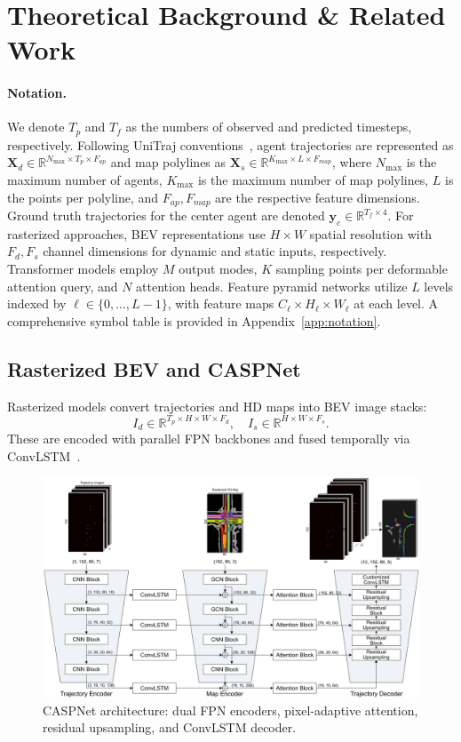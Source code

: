 \section{Theoretical Background \& Related Work}
\label{sec:background}

\paragraph{Notation.} We denote \(T_p\) and \(T_f\) as the numbers of observed and predicted timesteps, respectively. Following UniTraj conventions~\cite{unitrajFeng2024}, agent trajectories are represented as \(\boldsymbol{X}_d \in \mathbb{R}^{N_{\max} \times T_p \times F_{ap}}\) and map polylines as \(\boldsymbol{X}_s \in \mathbb{R}^{K_{\max} \times L \times F_{map}}\), where \(N_{\max}\) is the maximum number of agents, \(K_{\max}\) is the maximum number of map polylines, \(L\) is the points per polyline, and \(F_{ap}, F_{map}\) are the respective feature dimensions. Ground truth trajectories for the center agent are denoted \(\boldsymbol{y}_c \in \mathbb{R}^{T_f \times 4}\). For rasterized approaches, BEV representations use \(H \times W\) spatial resolution with \(F_d, F_s\) channel dimensions for dynamic and static inputs, respectively. Transformer models employ \(M\) output modes, \(K\) sampling points per deformable attention query, and \(N\) attention heads. Feature pyramid networks utilize \(L\) levels indexed by \(\ell \in \{0,\dots,L-1\}\), with feature maps \(C_\ell \times H_\ell \times W_\ell\) at each level. A comprehensive symbol table is provided in Appendix~\ref{app:notation}.

\subsection{Rasterized BEV and CASPNet}
Rasterized models convert trajectories and HD maps into BEV image stacks:
\[
I_d\in\mathbb{R}^{T_p\times H\times W\times F_d},\quad
I_s\in\mathbb{R}^{H\times W\times F_s}.
\]
These are encoded with parallel FPN backbones and fused temporally via ConvLSTM~\cite{caspnetSchäfer2022,arXiv:2201.06933v1}.

\begin{figure}[ht]
  \centering
  \includegraphics[width=\linewidth]{figures/caspnet_arch.png}
  \caption{CASPNet architecture: dual FPN encoders, pixel-adaptive attention, residual upsampling, and ConvLSTM decoder.}
  \label{fig:caspnet_overview}
\end{figure}

